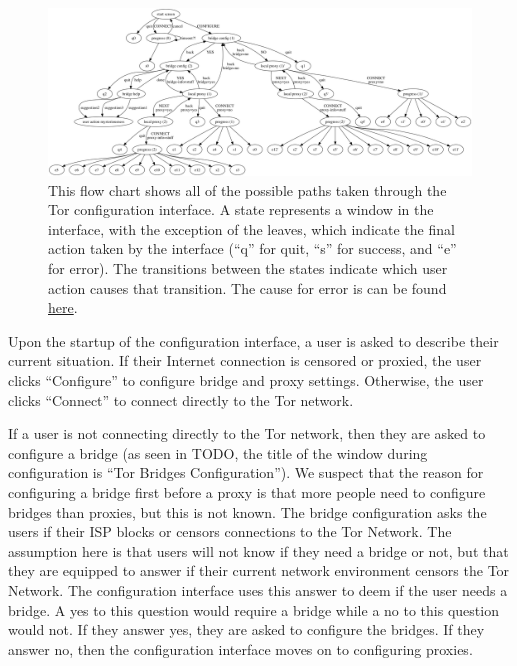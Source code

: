 \documentclass{template}
\begin{document}
\begin{figure}[t]
\label{fig:interface}
  \centering
    \includegraphics[width=\textwidth]{../torconfig.png}
    \caption{This flow chart shows all of the possible paths taken through the
    Tor configuration interface. A state represents a window in the interface,
    with the exception of the leaves, which indicate the final action taken by
    the interface (``q'' for quit, ``s'' for success, and ``e'' for error). The
    transitions between the states indicate which user action causes that
    transition. The cause for error is can be found
\href{https://github.com/lindanlee/circumvention-ux-tor/blob/master/torconfig.dot}{here}.}
\end{figure}

Upon the startup of the configuration interface, a user is asked to describe their 
current situation. If their Internet connection is censored or proxied, the user 
clicks ``Configure'' to configure bridge and proxy settings. Otherwise, the user
clicks ``Connect'' to connect directly to the Tor network. 

If a user is not connecting directly to the Tor network, then they are asked to 
configure a bridge (as seen in {\color {red} TODO}, the title of the window during configuration %
is ``Tor Bridges Configuration''). We suspect that the reason for configuring a bridge
first before a proxy is that more people need to configure bridges than proxies,
but this is not known. The bridge configuration asks the users if their ISP blocks
or censors connections to the Tor Network. The assumption here is that users will 
not know if they need a bridge or not, but that they are equipped to answer if their
current network environment censors the Tor Network. The configuration interface 
uses this answer to deem if the user needs a bridge. A yes to this question would
require a bridge while a no to this question would not. If they answer yes, they are 
asked to configure the bridges. If they answer no, then the configuration interface 
moves on to configuring proxies. 
\end{document}
